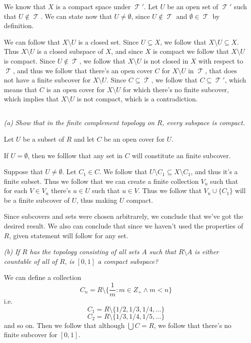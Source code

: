 \documentclass[11pt,oneside,titlepage]{book}
\DeclareMathOperator \topol {\mathcal {T}}
\newcommand{\set}[1]{\{ #1 \}}
\begin{document}
We know that $X$ is a compact space under $\topol'$. Let $U$ be an open set of $\topol'$
such that $U \notin \topol$. We can state now that $U \neq \emptyset$, since $U \notin \topol$
and $\emptyset \in \topol$ by definition.

We can follow that $X \setminus U$ is a closed set. Since $U \subseteq X$, we follow that
$X \setminus U \subseteq X$. Thus $X \setminus U$ is a closed subspace of $X$, and since $X$
is compact we follow that $X \setminus U$ is compact. Since $U \notin \topol$, we follow that
$X \setminus U$ is not closed in $X$ with respect to $\topol$, and thus we follow that
there's an open cover $C$ for $X \setminus U$ in $\topol$, that does not have a finite
subcover for $X \setminus U$. Since $C \subseteq \topol$, we follow that $C \subseteq \topol'$,
which means that $C$ is an open cover for $X \setminus U$ for which there's no finite
subcover, which implies that $X \setminus U$ is not compact, which is a contradiction.

\subsection{}

\textit{(a) Show that in the finite complement topology on $R$, every subspace is compact.}

Let $U$ be a subset of $R$ and let $C$ be an open cover for $U$.

If $U = \emptyset$, then we folllow that any set in $C$ will constitute an finite subcover.

Suppose that  $U \neq \emptyset$. Let $C_1 \in C$. We follow that
$U \setminus C_1 \subseteq X \setminus C_1$, and thus it's a finite subset. Thus we follow that
we can create a finite collection $V_u$ such that for each $V \in V_u$ there's $u \in U$
such that $u \in V$. Thus we follow that $V_u \cup \set{C_1}$ will be a finite subcover of $U$,
thus making $U$ compact.

Since subcovers and sets were chosen
arbitrarely, we conclude that we've got the desired result. We also can conclude that
since we haven't used the properties of $R$, given statement will follow for any set.

\textit{(b) If $R$ has the topology consisting of all sets $A$ such that $R \setminus A$
  is either countable of all of $R$, is $[0, 1]$ a compact subspace?}

We can define a collection
$$C_n = R \setminus \set{\frac{1}{m}: m \in Z_+ \land m < n}$$
i.e.
$$C_1 = R \setminus \set{1/2, 1/3, 1/4, ...}$$
$$C_2 = R \setminus \set{1/3, 1/4, 1/5, ...}$$
and so on. Then we follow that although $\bigcup{C} = R$, we follow that there's no finite subcover
for $[0, 1]$.
\end{document}
